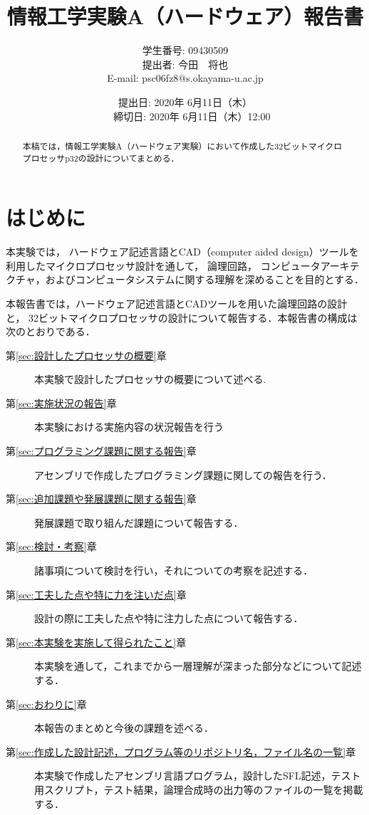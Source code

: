 \documentclass{jarticle}[11pt]
\title{{\normalsize 情報工学実験A（ハードウェア）報告書}}
\author{ 
  学生番号: 09430509 \\
  提出者: 今田　将也 \\
  E-mail: psc06fz8@s.okayama-u.ac.jp
}
\date{
  提出日: 2020年 6月11日（木） \\　%
  締切日: 2020年 6月11日（木）12:00     %
}
\begin{document}
\maketitle

\begin{abstract}
  本稿では，情報工学実験A（ハードウェア実験）において作成した32ビットマイクロプロセッサp32の設計についてまとめる．
\end{abstract}

\section{はじめに}
本実験では，
ハードウェア記述言語とCAD（computer aided design）ツールを利用したマイクロプロセッサ設計を通して，
論理回路， コンピュータアーキテクチャ，およびコンピュータシステムに関する理解を深めることを目的とする．

本報告書では，ハードウェア記述言語とCADツールを用いた論理回路の設計と，
32ビットマイクロプロセッサの設計について報告する．本報告書の構成は次のとおりである．



\begin{description}
  \item[第\ref{sec:設計したプロセッサの概要}章] 本実験で設計したプロセッサの概要について述べる.
  \item[第\ref{sec:実施状況の報告}章] 本実験における実施内容の状況報告を行う
  \item[第\ref{sec:プログラミング課題に関する報告}章] アセンブリで作成したプログラミング課題に関しての報告を行う．
  \item[第\ref{sec:追加課題や発展課題に関する報告}章] 発展課題で取り組んだ課題について報告する．
  \item[第\ref{sec:検討・考察}章] 諸事項について検討を行い，それについての考察を記述する．
  \item[第\ref{sec:工夫した点や特に力を注いだ点}章] 設計の際に工夫した点や特に注力した点について報告する．
  \item[第\ref{sec:本実験を実施して得られたこと}章] 本実験を通して，これまでから一層理解が深まった部分などについて記述する．
  \item[第\ref{sec:おわりに}章] 本報告のまとめと今後の課題を述べる． 
  \item[第\ref{sec:作成した設計記述，プログラム等のリポジトリ名，ファイル名の一覧}章] 本実験で作成したアセンブリ言語プログラム，設計したSFL記述，テスト用スクリプト，テスト結果，論理合成時の出力等のファイルの一覧を掲載する．
\end{description}
\end{document}

